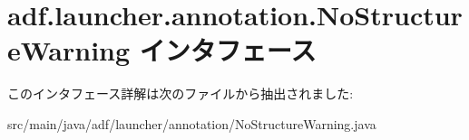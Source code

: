 \hypertarget{interfaceadf_1_1launcher_1_1annotation_1_1NoStructureWarning}{}\section{adf.\+launcher.\+annotation.\+No\+Structure\+Warning インタフェース}
\label{interfaceadf_1_1launcher_1_1annotation_1_1NoStructureWarning}


このインタフェース詳解は次のファイルから抽出されました\+:\begin{DoxyCompactItemize}
\item 
src/main/java/adf/launcher/annotation/No\+Structure\+Warning.\+java\end{DoxyCompactItemize}
